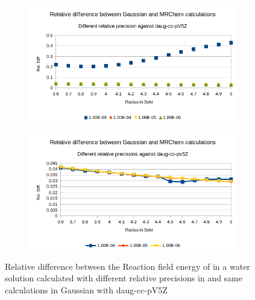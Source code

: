\documentclass[../master_thesis.tex]{subfiles}
\begin{document}
\begin{figure}[h!]
  \centering
  \begin{subfigure}[b]{0.75\linewidth}
    \includegraphics[width=\linewidth]{img/lipprecallreldiff.png}
  \end{subfigure}
  \begin{subfigure}[b]{0.75\linewidth}
    \includegraphics[width=\linewidth]{img/lipprecallreldiffexcl.png}
  \end{subfigure}
  \caption{Relative difference between the Reaction field energy of  in a water solution calculated with different relative precisions in \mrchem  and same calculations in Gaussian with daug-cc-pV5Z}
  \label{fig:lipprecreldef}
\end{figure}
\end{document}
